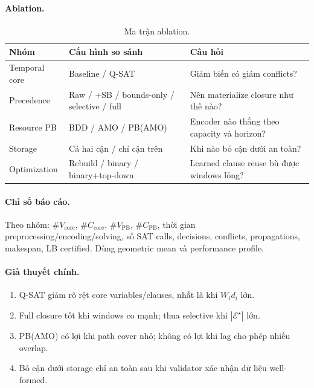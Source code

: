 \documentclass[11pt,a4paper]{article}
\theoremstyle{remark}
\begin{document}
\paragraph{Ablation.}

\begin{table}[htbp]
\centering
\caption{Ma trận ablation.}
\label{tab:ablation}
\begin{tabularx}{\textwidth}{@{}p{}Y Y@{}}
\toprule
\textbf{Nhóm} & \textbf{Cấu hình so sánh} & \textbf{Câu hỏi}\\
\midrule
Temporal core & Baseline / Q-SAT & Giảm biến có giảm conflicts?\\
Precedence & Raw / +SB / bounds-only / selective / full & Nên materialize closure như thế nào?\\
Resource PB & BDD / AMO / PB(AMO) & Encoder nào thắng theo capacity và horizon?\\
Storage & Cả hai cận / chỉ cận trên & Khi nào bỏ cận dưới an toàn?\\
Optimization & Rebuild / binary / binary+top-down & Learned clause reuse bù được windows lỏng?\\
\bottomrule
\end{tabularx}
\end{table}

\paragraph{Chỉ số báo cáo.}
Theo nhóm: $\#V_\mathrm{core}$, $\#C_\mathrm{core}$, $\#V_\mathrm{PB}$,
$\#C_\mathrm{PB}$, thời gian preprocessing/encoding/solving, số SAT calls,
decisions, conflicts, propagations, makespan, LB certified.
Dùng geometric mean và performance profile.

\paragraph{Giả thuyết chính.}
\begin{enumerate}
  \item Q-SAT giảm rõ rệt core variables/clauses, nhất là khi $W_i d_i$ lớn.
  \item Full closure tốt khi windows co mạnh; thua selective khi $|\mathcal{E}^\star|$ lớn.
  \item PB(AMO) có lợi khi path cover nhỏ; không có lợi khi lag cho phép nhiều overlap.
  \item Bỏ cận dưới storage chỉ an toàn sau khi validator xác nhận dữ liệu well-formed.
\end{enumerate}
\end{document}
